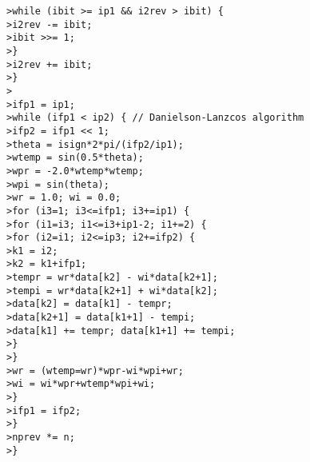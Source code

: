 \texttt{>\quad \qquad\qquad while (ibit >= ip1 \&\& i2rev > ibit) \{} \\
\texttt{>\quad \qquad\qquad\qquad i2rev -= ibit;} \\
\texttt{>\quad \qquad\qquad\qquad ibit >>= 1;} \\
\texttt{>\quad \qquad\qquad \}} \\
\texttt{>\quad \qquad\qquad i2rev += ibit;} \\
\texttt{>\quad \qquad \}} \\
\texttt{>\quad } \\
\texttt{>\quad \qquad ifp1 = ip1;} \\
\texttt{>\quad \qquad while (ifp1 < ip2) \{ // Danielson-Lanzcos algorithm} \\
\texttt{>\quad \qquad\qquad ifp2 = ifp1 << 1;} \\
\texttt{>\quad \qquad\qquad theta = isign*2*pi/(ifp2/ip1);} \\
\texttt{>\quad \qquad\qquad wtemp = sin(0.5*theta);} \\
\texttt{>\quad \qquad\qquad wpr = -2.0*wtemp*wtemp;} \\
\texttt{>\quad \qquad\qquad wpi = sin(theta);} \\
\texttt{>\quad \qquad\qquad wr = 1.0; wi = 0.0;} \\
\texttt{>\quad \qquad\qquad for (i3=1; i3<=ifp1; i3+=ip1) \{} \\
\texttt{>\quad \qquad\qquad\qquad for (i1=i3; i1<=i3+ip1-2; i1+=2) \{} \\
\texttt{>\quad \qquad\qquad\qquad\qquad for (i2=i1; i2<=ip3; i2+=ifp2) \{} \\
\texttt{>\quad \qquad\qquad\qquad\qquad\qquad k1 = i2;} \\
\texttt{>\quad \qquad\qquad\qquad\qquad\qquad k2 = k1+ifp1;} \\
\texttt{>\quad \qquad\qquad\qquad\qquad\qquad tempr = wr*data[k2] - wi*data[k2+1];} \\
\texttt{>\quad \qquad\qquad\qquad\qquad\qquad tempi = wr*data[k2+1] + wi*data[k2];} \\
\texttt{>\quad \qquad\qquad\qquad\qquad\qquad data[k2] = data[k1] - tempr;} \\
\texttt{>\quad \qquad\qquad\qquad\qquad\qquad data[k2+1] = data[k1+1] - tempi;} \\
\texttt{>\quad \qquad\qquad\qquad\qquad\qquad data[k1] += tempr; data[k1+1] += tempi;} \\
\texttt{>\quad \qquad\qquad\qquad\qquad \}} \\
\texttt{>\quad \qquad\qquad\qquad \}} \\
\texttt{>\quad \qquad\qquad\qquad wr = (wtemp=wr)*wpr-wi*wpi+wr;} \\
\texttt{>\quad \qquad\qquad\qquad wi = wi*wpr+wtemp*wpi+wi;} \\
\texttt{>\quad \qquad\qquad \}} \\
\texttt{>\quad \qquad\qquad ifp1 = ifp2;} \\
\texttt{>\quad \qquad \}} \\
\texttt{>\quad \qquad nprev *= n;} \\
\texttt{>\quad \}}


